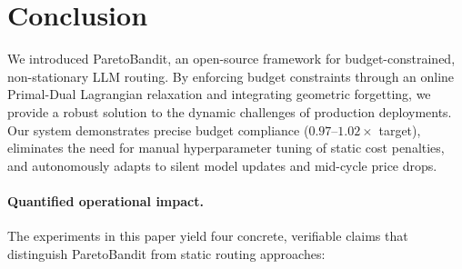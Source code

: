 \section{Conclusion}

We introduced ParetoBandit, an open-source framework for budget-constrained, non-stationary LLM routing.  By enforcing budget constraints through an online Primal-Dual Lagrangian relaxation and integrating geometric forgetting, we provide a robust solution to the dynamic challenges of production deployments.  Our system demonstrates precise budget compliance ($0.97$--$1.02\times$ target), eliminates the need for manual hyperparameter tuning of static cost penalties, and autonomously adapts to silent model updates and mid-cycle price drops.

\paragraph{Quantified operational impact.}
The experiments in this paper yield four concrete, verifiable claims that distinguish ParetoBandit from static routing approaches:
